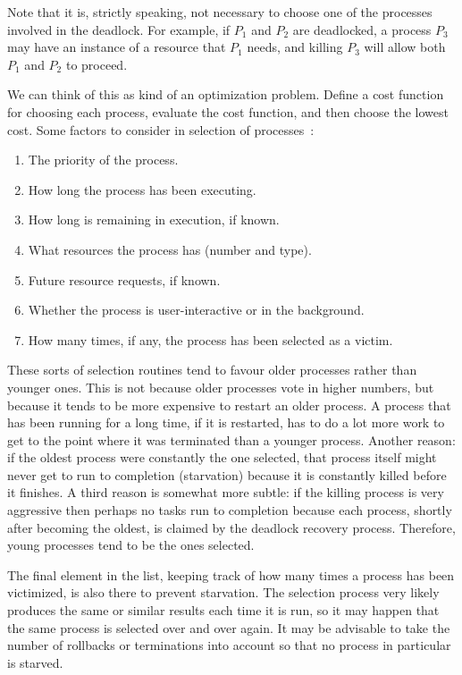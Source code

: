 \documentclass[a4paper]{report}
\begin{document}
Note that it is, strictly speaking, not necessary to choose one of the processes involved in the deadlock. For example, if $P_{1}$ and $P_{2}$ are deadlocked, a process $P_{3}$  may have an instance of a resource that $P_{1}$ needs, and killing $P_{3}$ will allow both $P_{1}$ and $P_{2}$ to proceed.

We can think of this as kind of an optimization problem. Define a cost function for choosing each process, evaluate the cost function, and then choose the lowest cost. Some factors to consider in selection of processes~\cite{osc}:

\begin{enumerate}
	\item The priority of the process.
	\item How long the process has been executing.
	\item How long is remaining in execution, if known.
	\item What resources the process has (number and type).
	\item Future resource requests, if known.
	\item Whether the process is user-interactive or in the background.
	\item How many times, if any, the process has been selected as a victim.
\end{enumerate}

These sorts of selection routines tend to favour older processes rather than younger ones. This is not because older processes vote in higher numbers, but because it tends to be more expensive to restart an older process. A process that has been running for a long time, if it is restarted, has to do a lot more work to get to the point where it was terminated than a younger process. Another reason: if the oldest process were constantly the one selected, that process itself might never get to run to completion (starvation) because it is constantly killed before it finishes. A third reason is somewhat more subtle: if the killing process is very aggressive then perhaps no tasks run to completion because each process, shortly after becoming the oldest, is claimed by the deadlock recovery process. Therefore, young processes tend to be the ones selected.

The final element in the list, keeping track of how many times a process has been victimized, is also there to prevent starvation. The selection process very likely produces the same or similar results each time it is run, so it may happen that the same process is selected over and over again. It may be advisable to take the number of rollbacks or terminations into account so that no process in particular is starved.
\end{document}
